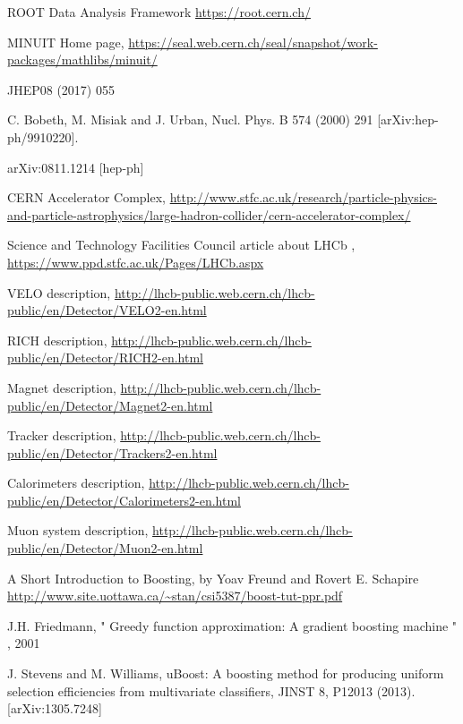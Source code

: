 \documentclass[english]{uzhpub}
\begin{document}
 \begin{thebibliography}{100}

    ROOT Data Analysis Framework \url{https://root.cern.ch/}

    MINUIT Home page, \url{https://seal.web.cern.ch/seal/snapshot/work-packages/mathlibs/minuit/}

    JHEP08 (2017) 055

     C. Bobeth, M. Misiak and J. Urban, Nucl. Phys. B 574 (2000) 291 [arXiv:hep-ph/9910220].

    	arXiv:0811.1214 [hep-ph]

    CERN Accelerator Complex,
   \url{http://www.stfc.ac.uk/research/particle-physics-and-particle-astrophysics/large-hadron-collider/cern-accelerator-complex/}

    Science and Technology Facilities Council article about LHCb ,
   \url{https://www.ppd.stfc.ac.uk/Pages/LHCb.aspx}

    VELO description,
   \url{http://lhcb-public.web.cern.ch/lhcb-public/en/Detector/VELO2-en.html}

    RICH description,
   \url{http://lhcb-public.web.cern.ch/lhcb-public/en/Detector/RICH2-en.html}

    Magnet description,
   \url{http://lhcb-public.web.cern.ch/lhcb-public/en/Detector/Magnet2-en.html}

    Tracker description,
   \url{http://lhcb-public.web.cern.ch/lhcb-public/en/Detector/Trackers2-en.html}

    Calorimeters description,
   \url{http://lhcb-public.web.cern.ch/lhcb-public/en/Detector/Calorimeters2-en.html}

    Muon system description,
   \url{http://lhcb-public.web.cern.ch/lhcb-public/en/Detector/Muon2-en.html}

     A Short Introduction to Boosting, by Yoav Freund and Rovert E. Schapire \url{http://www.site.uottawa.ca/~stan/csi5387/boost-tut-ppr.pdf}

    J.H. Friedmann, " Greedy function approximation: A gradient boosting machine "  , 2001



     J. Stevens and M. Williams, uBoost: A boosting method for producing uniform selection efficiencies from multivariate classifiers, JINST 8, P12013 (2013). [arXiv:1305.7248]


\end{thebibliography}
\end{document}
